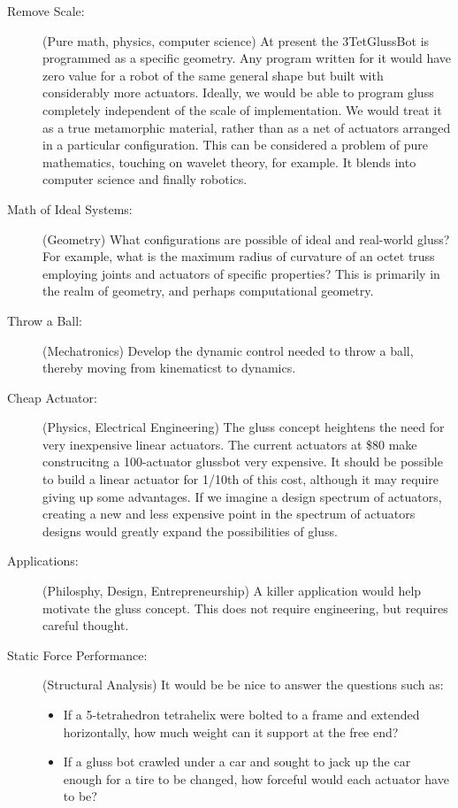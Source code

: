 \documentclass[11pt]{article}
\begin{document}
\begin{description}
\item [Remove Scale:] (Pure math, physics, computer science) At present the 3TetGlussBot is programmed
  as a specific geometry. Any program
  written for it would have zero value for a robot of the same general shape but built with considerably
  more actuators. Ideally, we would be able to program gluss completely independent of the scale
  of implementation. We would treat it as a true metamorphic material, rather than as a net of
  actuators arranged in a particular configuration. This can be considered a problem of pure
  mathematics, touching on wavelet theory, for example. It blends into computer science and
  finally robotics.
\item [Math of Ideal Systems:] (Geometry) What configurations are possible of ideal and real-world gluss?
  For example, what is the maximum radius of curvature of an octet truss employing joints
  and actuators of specific properties? This is primarily in the realm of geometry, and perhaps
  computational geometry.
\item [Throw a Ball:] (Mechatronics) Develop the dynamic control needed to throw a ball, thereby moving from
  kinematicst to dynamics.
\item [Cheap Actuator:] (Physics, Electrical Engineering) The gluss concept heightens the need for very inexpensive linear
  actuators. The current actuators at \$80 make construcitng a 100-actuator glussbot very expensive.
  It should be possible to build a linear actuator for 1/10th of this cost, although it may require
  giving up some advantages. If we imagine a design spectrum of actuators, creating a new and
  less expensive point in the spectrum of actuators designs would greatly
  expand the possibilities of gluss.
\item [Applications:] (Philosphy, Design, Entrepreneurship) A killer application would help motivate the gluss concept. This does not
  require engineering, but requires careful thought.
\item [Static Force Performance:] (Structural Analysis)
It would be be nice to answer the questions such as:
\begin{itemize}  
\item If a 5-tetrahedron tetrahelix were bolted to a frame and extended horizontally, how much
  weight can it support at the free end?
\item If a gluss bot crawled under a car and sought to jack up the car enough for a tire
  to be changed, how forceful would each actuator have to be?

\end{itemize}
\end{description}
\end{document}
